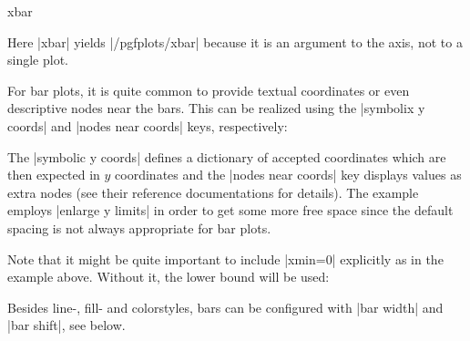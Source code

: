 {\begin{plottype}{xbar}
\begin{codeexample}[]
\end{codeexample}
Here |xbar| yields |/pgfplots/xbar| because it is an argument to the axis, not to a single plot.

	For bar plots, it is quite common to provide textual coordinates or even descriptive nodes near the bars.
	This can be realized using the |symbolix y coords| and |nodes near coords| keys, respectively:
\begin{codeexample}[]
\end{codeexample}
	The |symbolic y coords| defines a dictionary of accepted coordinates which are then expected in $y$ coordinates and the |nodes near coords| key displays values as extra nodes (see their reference documentations for details). The example employs |enlarge y limits| in order to get some more free space since the default spacing is not always appropriate for bar plots.

	Note that it might be quite important to include |xmin=0| explicitly as in the example above. Without it, the lower bound will be used:
\begin{codeexample}[]
\end{codeexample}

	Besides line-, fill- and colorstyles, bars can be configured with |bar width| and |bar shift|, see below.
\end{plottype}

}
